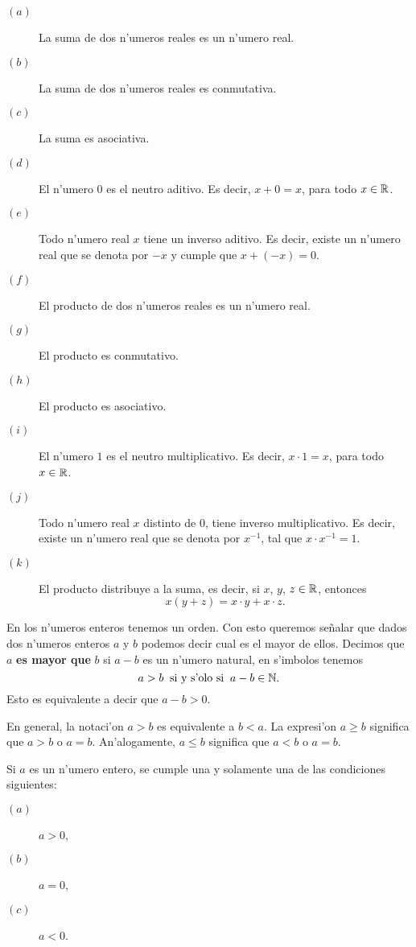 \begin{propiedades}
\begin{description}
\item[$(a)$] La suma de dos n'umeros reales es un n'umero real.
\item[$(b)$] La suma de dos n'umeros reales es conmutativa.
\item[$(c)$] La suma es asociativa.
\item[$(d)$] El n'umero $0$ es el neutro aditivo. Es decir, $x+0=x$, para todo $x \in \mathbb{R}$.
\item[$(e)$] Todo n'umero real $x$ tiene un inverso aditivo. Es decir, existe un n'umero real que se denota por $-x$ y cumple que  $x+(-x)= 0$.
\item[$(f)$] El producto de dos n'umeros reales es un n'umero real.
\item[$(g)$] El producto  es conmutativo.
\item[$(h)$] El producto  es asociativo.
\item[$(i)$] El n'umero $1$ es el neutro multiplicativo. Es decir, $x\cdot 1=x$, para todo $x \in \mathbb{R}$.
\item[$(j)$] Todo n'umero real $x$ distinto de $0$, tiene inverso multiplicativo.  Es decir, existe  un n'umero real que se denota por $x^{-1}$, tal que
$x\cdot x^{-1} =1$.
\item[$(k)$] El producto distribuye a la suma, es decir, si
$x$, $y$, $z\in \mathbb{R}$, entonces
$$
      x \left(y+z\right ) = x\cdot y+ x\cdot z.
$$
\end{description}
\end{propiedades}



\noindent En los n'umeros enteros tenemos un orden. Con esto queremos se\~nalar que  dados dos n'umeros enteros $a$ y $b$ podemos decir cual es el mayor de ellos.  Decimos que $a$ {\bf es mayor que} $b$ si $a-b$ es un n'umero natural, en s'imbolos tenemos
$$
       a > b \;\;\text{si y s'olo si}\;\; a-b \in\mathbb{N}.
$$
Esto es equivalente a decir que $a-b>0$.

\noindent En general, la notaci'on $a>b$ es equivalente a $b<a$.  La expresi'on $a\geq b$ significa que $a>b$ o $a=b$. An'alogamente, $a\leq b$ significa que $a < b$ o $a=b$.


\begin{propiedades}
Si $a$ es un n'umero entero, se cumple una y solamente una de las condiciones siguientes:
\begin{description}
\item[$(a)$] $a>0$,
\item[$(b)$] $a=0$,
\item[$(c)$] $a<0$.
\end{description}
\end{propiedades}


